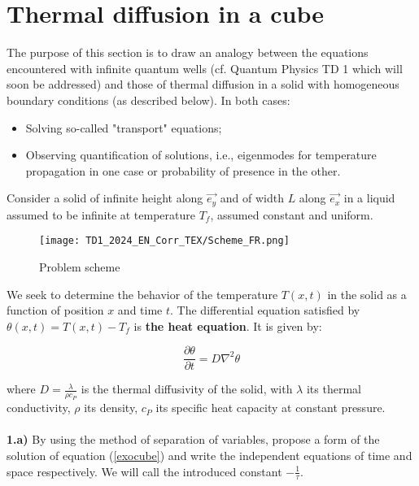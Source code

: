 \section{Thermal diffusion in a cube}

\noindent The purpose of this section is to draw an analogy between the equations encountered with infinite quantum wells (cf. Quantum Physics TD 1 which will soon be addressed) and those of thermal diffusion in a solid with homogeneous boundary conditions (as described below).
In both cases:

\begin{itemize}
    \item Solving so-called "transport" equations;
    \item Observing quantification of solutions, i.e., eigenmodes for temperature propagation in one case or probability of presence in the other.
\end{itemize}

\noindent Consider a solid of infinite height along $\vec{e_y}$ and of width $L$ along $\vec{e_x}$ in a liquid assumed to be infinite at temperature $T_f$, assumed constant and uniform.

\begin{figure}[htbp]
    \centering
    \texttt{[image: TD1\_2024\_EN\_Corr\_TEX/Scheme\_FR.png]}
    \caption{Problem scheme}
    \label{fig:schema_diff_thermique}
\end{figure}

\noindent We seek to determine the behavior of the temperature $T(x,t)$ in the solid as a function of position $x$ and time $t$.
The differential equation satisfied by $\theta(x,t) = T(x,t) - T_f$ is \textbf{the heat equation}. It is given by:

\begin{equation}
\frac{\partial \theta}{\partial t} = D \nabla^2 \theta
\label{exocube}
\end{equation}

\noindent where $D = \displaystyle \frac{\lambda}{\rho c_P}$ is the thermal diffusivity of the solid, with $\lambda$ its thermal conductivity, $\rho$ its density, $c_P$ its specific heat capacity at constant pressure.\\ \\
\noindent \textbf{1.a)} By using the method of separation of variables, propose a form of the solution of equation (\ref{exocube}) and write the independent equations of time and space respectively. We will call the introduced constant $\displaystyle -\frac{1}{\tau}$.\\

